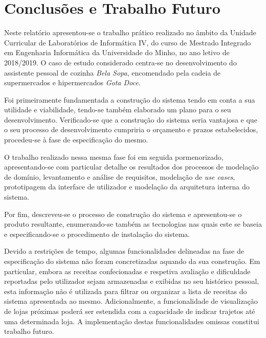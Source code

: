 
\section{Conclusões e Trabalho Futuro}
\label{cap:conclusao}


Neste relatório apresentou-se o trabalho prático realizado no âmbito da Unidade Curricular de Laboratórios de Informática IV, do curso de Mestrado Integrado em Engenharia Informática da Universidade do Minho, no ano letivo de 2018/2019. O caso de estudo considerado centra-se no desenvolvimento do assistente pessoal de cozinha \emph{Bela Sopa}, encomendado pela cadeia de supermercados e hipermercados \emph{Gota Doce}.

Foi primeiramente fundamentada a construção do sistema tendo em conta a sua utilidade e viabilidade, tendo-se também elaborado um plano para o seu desenvolvimento. Verificado-se que a construção do sistema seria vantajosa e que o seu processo de desenvolvimento cumpriria o orçamento e prazos estabelecidos, procedeu-se à fase de especificação do mesmo.

O trabalho realizado nessa mesma fase foi em seguida pormenorizado, apresentando-se com particular detalhe os resultados dos processos de modelação de domínio, levantamento e análise de requisitos, modelação de \emph{use cases}, prototipagem da interface de utilizador e modelação da arquitetura interna do sistema.

Por fim, descreveu-se o processo de construção do sistema e apresentou-se o produto resultante, enumerando-se também as tecnologias nas quais este se baseia e especificando-se o procedimento de instalação do sistema.

Devido a restrições de tempo, algumas funcionalidades delineadas na fase de especificação do sistema não foram concretizadas aquando da sua construção. Em particular, embora as receitas confecionadas e respetiva avaliação e dificuldade reportadas pelo utilizador sejam armazenadas e exibidas no seu histórico pessoal, esta informação não é utilizada para filtrar ou organizar a lista de receitas do sistema apresentada ao mesmo. Adicionalmente, a funcionalidade de visualização de lojas próximas poderá ser estendida com a capacidade de indicar trajetos até uma determinada loja. A implementação destas funcionalidades omissas constitui trabalho futuro.

